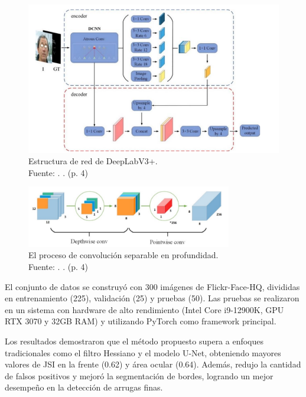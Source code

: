 \begin{figure}[!ht]
	\begin{center}
		\includegraphics[width=1\textwidth]{2/figures/Meto1.png}
		\caption[Estructura de red de DeepLabV3+]{Estructura de red de DeepLabV3+.\\
			Fuente: \cite{Zhong2024}. . (p. 4)}
		\label{2:fig3}
	\end{center}
\end{figure}


\begin{figure}[!ht]
	\begin{center}
		\includegraphics[width=0.80\textwidth]{2/figures/Meto2.png}
		\caption[El proceso de convolución separable en profundidad]{El proceso de convolución separable en profundidad.\\
			Fuente: \cite{Zhong2024}. . (p. 4)}
		\label{2:fig4}
	\end{center}
\end{figure}


El conjunto de datos se construyó con 300 imágenes de Flickr-Face-HQ, divididas en entrenamiento (225), validación (25) y pruebas (50). Las pruebas se realizaron en un sistema con hardware de alto rendimiento (Intel Core i9-12900K, GPU RTX 3070 y 32GB RAM) y utilizando PyTorch como framework principal.

Los resultados demostraron que el método propuesto supera a enfoques tradicionales como el filtro Hessiano y el modelo U-Net, obteniendo mayores valores de JSI en la frente (0.62) y área ocular (0.64). Además, redujo la cantidad de falsos positivos y mejoró la segmentación de bordes, logrando un mejor desempeño en la detección de arrugas finas.


